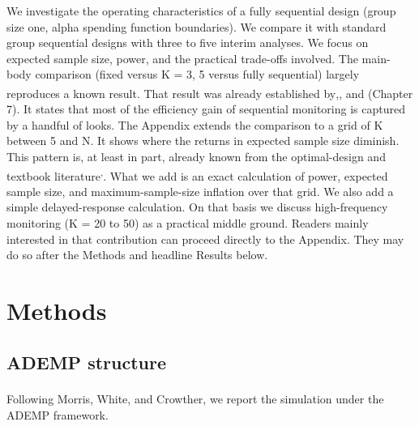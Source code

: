 \documentclass[
  11pt,
]{article}
\begin{document}
We investigate the operating characteristics of a
fully sequential design (group size one, alpha
spending function boundaries). We compare it with
standard group sequential designs with three to five
interim analyses. We focus on expected sample size,
power, and the practical trade-offs involved. The
main-body comparison (fixed versus K = 3, 5 versus
fully sequential) largely reproduces a known result.
That result was already established by\textsuperscript{},\textsuperscript{}, and\textsuperscript{} (Chapter 7). It states that most of
the efficiency gain of sequential monitoring is
captured by a handful of looks. The Appendix extends
the comparison to a grid of K between 5 and N. It
shows where the returns in expected sample size
diminish. This pattern is, at least in part, already
known from the optimal-design and textbook literature\textsuperscript{,}. What we add is
an exact calculation of power, expected sample size,
and maximum-sample-size inflation over that grid. We
also add a simple delayed-response calculation. On that
basis we discuss high-frequency monitoring (K = 20 to
50) as a practical middle ground. Readers mainly
interested in that contribution can proceed directly
to the Appendix. They may do so after the Methods and
headline Results below.

\section{Methods}\label{methods}

\subsection{ADEMP structure}\label{ademp-structure}

Following Morris, White, and Crowther\textsuperscript{}, we report the simulation under the
ADEMP framework.
\end{document}
